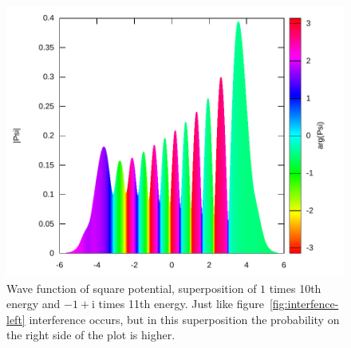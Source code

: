 \documentclass[11pt,DIV=10,final]{scrreprt} %
\newcommand{\mi}{{\text{i}}}
\begin{document}
\begin{figure}[H]
\centering
\includegraphics[width=\textwidth]{plots/super-square-10_1-11_-1+i.pdf}
\caption{\label{fig:interference-right} Wave function of square potential, superposition of $1$ times 10th energy and $-1+\mi$ times 11th energy. Just like figure~\ref{fig:interfence-left}
    interference occurs, but in this superposition the probability on the right side of the plot is higher.}
\end{figure}
\end{document}
